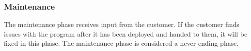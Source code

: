\subsubsection{Maintenance}

The maintenance phase receives input from the customer. If the 
customer finds issues with the program after it has been deployed and handed to them, it 
will be fixed in this phase. The maintenance phase is considered a 
never-ending phase\cite{waterfallexplained}.